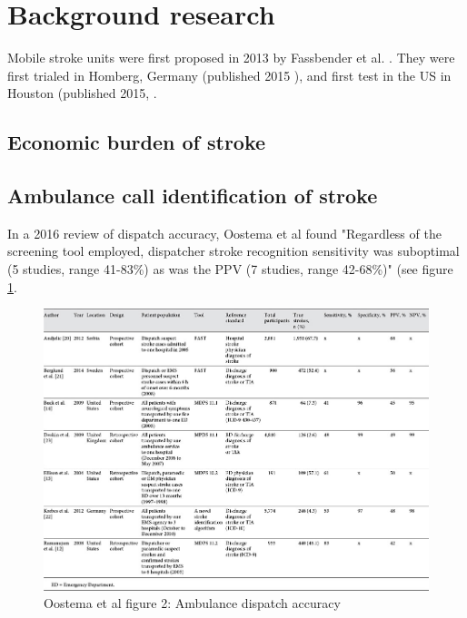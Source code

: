 \section{Background research}

Mobile stroke units were first proposed in 2013 by Fassbender et al. \cite{fassbender_mobile_2003}. They were first trialed in Homberg, Germany (published 2015 \cite{walter_diagnosis_2012}), and first test in the US in Houston (published 2015, \cite{parker_establishing_2015}.


\subsection{Economic burden of stroke}


\subsection{Ambulance call identification of stroke}

In a 2016 review of dispatch accuracy, Oostema et al \cite{oostema_dispatcher_2016} found "Regardless of the screening tool employed, dispatcher stroke recognition sensitivity was suboptimal (5 studies, range 41-83\%) as was the PPV (7 studies, range 42-68\%)" (see figure \ref{fig:oostema}.

\begin{figure}
    \centering
    \includegraphics[width=0.9\linewidth]{images_background/oosetema_dispatch_accuracy}
    \caption{Oostema et al figure 2: Ambulance dispatch accuracy}
    \label{fig:oostema}
\end{figure}

